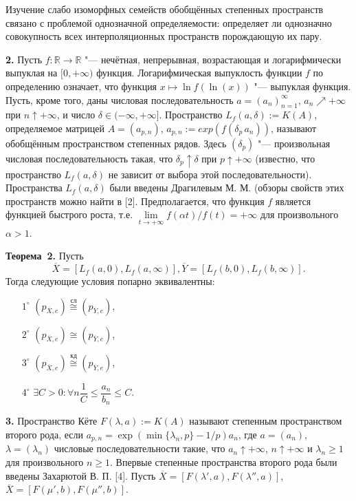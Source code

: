 Изучение слабо изоморфных семейств обобщённых степенных про\-ст\-ранств связано с проблемой однозначной
определяемости: определяет ли однозначно совокупность всех интерполяционных пространств
порождающую их пару.

{\bf 2. }Пусть $f:{\mathbb R}\to{\mathbb R}$ "--- нечётная, непрерывная, возрастающая и логарифмически выпуклая
на $[0,+\infty )$ функция. Логарифмическая выпуклость функции $f$ по определению означает, что функция
$x\mapsto \ln f(\ln(x))$ "--- выпуклая функция. Пусть, кроме того, даны числовая последовательность
$a=(a_{n})_{n=1}^{\infty }$, $a_n\nearrow +\infty $ при $n\uparrow +\infty $,
и число $\delta \in (-\infty ,+\infty ]$. Пространство $L_{f}(a,\delta ):=K(A)$, определяемое
матрицей $A=(a_{p,n})$, $a_{p,n}:= exp (f(\delta_p\, a_n))$,
называют обобщённым пространством степенных рядов.
Здесь $(\delta_p)$ "--- произвольная
числовая последовательность такая, что $\delta_p \uparrow \delta $ при $p\uparrow +\infty $
(известно, что пространство $L_{f}(a,\delta )$ не зависит от выбора этой последовательности). Пространства $L_{f}(a,\delta )$
были введены Драгилевым М. М. (обзоры свойств этих пространств можно найти в [2].
Предполагается, что функция $f$ является функцией быстрого роста, т.е.
$\lim\limits_{t\to +\infty }f(\alpha t)/f(t)=+\infty $ для произвольного $\alpha >1$.

\noindent\textbf{Теорема~2.}
Пусть
$$
\overline{X}=[L_{f}(a,0),L_{f}(a,\infty )], \overline{Y}=[L_{f}(b,0),L_{f}(b,\infty )].
$$
Тогда следующие условия попарно эквивалентны:
\begin{itemize}
\item[$1^{\circ}$] $(p_{\overline{X},e})\stackrel{\text{сл}}{\cong}(p_{\overline{Y},e})$,
\item[$2^{\circ}$] $(p_{\overline{X},e})\cong(p_{\overline{Y},e})$,
\item[$3^{\circ}$] $(p_{\overline{X},e})\stackrel{\text{кд}}{\cong}(p_{\overline{Y},e})$,
\item[$4^{\circ}$] $\exists{C>0:}\forall{n} \dfrac{1}{C}\leqslant \dfrac{a_{n}}{b_{n}}\leqslant C$.
\end{itemize}

{\bf 3. }Пространство Кёте $F(\lambda ,a):=K(A)$ называют степенным пространством второго рода, если
$a_{p,n}=\exp(\min\{\lambda_n,p \}-1/p)a_{n}$, где $a=(a_n)$, $\lambda=(\lambda_n)$ числовые
последовательности такие, что $a_n\uparrow +\infty $, $n\uparrow +\infty $ и $\lambda_n\geqslant 1$ для
произвольного $n\geqslant 1$. Впервые степенные пространства
второго рода были введены Захарютой В. П. [4].
Пусть $\overline{X}=[F(\lambda',a),F(\lambda'',a)]$, $\overline{X}=[F(\mu',b),F(\mu'',b)]$.

